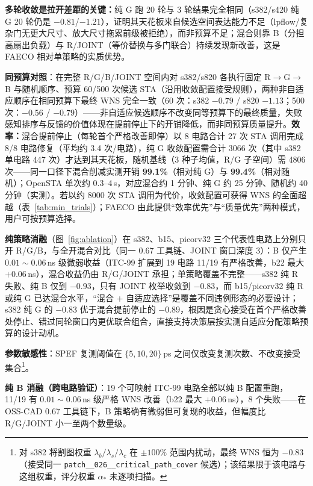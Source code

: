 \documentclass[journal]{IEEEtran}
\begin{document}
\textbf{多轮收敛是拉开差距的关键：}纯 G 跑 20 轮与 3 轮结果完全相同（s382/s420 纯 G 20 轮仍是 $-0.81$/$-1.21$），证明其天花板来自候选空间表达能力不足（lpflow/复杂门无更大尺寸、放大尺寸拖累前级被拒绝），而非预算不足；混合则靠 B（分担高扇出负载）与 R/JOINT（等价替换与多门联合）持续发现新改善，这是 FAECO 相对单策略的实质优势。

\textbf{同预算对照}：在完整 R/G/B/JOINT 空间内对 s382/s820 各执行固定 R$\rightarrow$G$\rightarrow$B 与随机顺序、预算 60/500 次候选 STA（沿用收敛配置接受规则），两种非自适应顺序在相同预算下最终 WNS 完全一致（60 次：s382 $-0.79$ / s820 $-1.13$；500 次：$-0.56$ / $-0.79$）——非自适应候选顺序不改变同等预算下的最终质量，失败感知排序与反馈的价值体现在提前停止下的开销降低，而非同预算质量提升。\textbf{效率：}混合提前停止（每轮首个严格改善即停）以 8 电路合计 27 次 STA 调用完成 8/8 电路修复（平均约 3.4 次/电路），纯 G 收敛配置需合计 3066 次（其中 s382 单电路 447 次）才达到其天花板，随机基线（3 种子均值，R/G 子空间）需 4806 次——同一口径下混合削减实测开销 \textbf{99.1\%}（相对纯 G）与 \textbf{99.4\%}（相对随机）；OpenSTA 单次约 0.3--4\,s，对应混合约 1 分钟、纯 G 约 25 分钟、随机约 40 分钟（实测）。若以约 8000 次 STA 调用为代价，收敛配置可获得 WNS 的全面超越（表~\ref{tab:min_trials}）；FAECO 由此提供“效率优先”与“质量优先”两种模式，用户可按预算选择。

\textbf{纯策略消融}（图~\ref{fig:ablation}）在 s382、b15、picorv32 三个代表性电路上分别只开 R/G/B，与全开混合对比（同一 0.67 工具链、JOINT 窗口深度 3）：B 仅产生 $0.01\!\sim\!0.06\,$ns 级微弱收益（ITC-99 扩展到 19 电路 11/19 有严格改善，b22 最大 $+0.06\,$ns），混合收益仍由 R/G/JOINT 承担；单策略覆盖不完整——s382 纯 R 失败、纯 B 仅到 $-0.93$，只有 JOINT 枚举收敛到 $-0.83$，而 b15/picorv32 纯 R 或纯 G 已达混合水平，“混合 + 自适应选择”是覆盖不同违例形态的必要设计；s382 纯 G 的 $-0.83$ 优于混合提前停止的 $-0.89$，根因是贪心接受在首个严格改善处停止、错过同轮窗口内更优联合组合，直接支持决策层按实测自适应分配策略预算的设计动机。

\textbf{参数敏感性}：SPEF 复测阈值在 $\{5,10,20\}\,$ps 之间仅改变复测次数、不改变接受集合\footnote{对 s382 将割图权重 $\lambda_b/\lambda_s/\lambda_c$ 在 $\pm 100\%$ 范围内扰动，最终 WNS 恒为 $-0.83$（接受同一 \texttt{patch\_\_026\_\_critical\_path\_cover} 候选）；该结果限于该电路与这组权重，评分权重 $\alpha_*$ 未逐项扫描。}。

\textbf{纯 B 消融（跨电路验证）}：19 个可映射 ITC-99 电路全部以纯 B 配置重跑，11/19 有 $0.01\!\sim\!0.06\,$ns 级严格 WNS 改善（b22 最大 $+0.06\,$ns），8 个失败——在 OSS-CAD 0.67 工具链下，B 策略确有微弱但可复现的收益，但幅度比 R/G/JOINT 小一至两个数量级。
\end{document}
